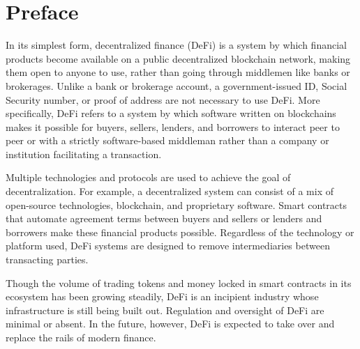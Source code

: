 \chapter*{Preface}
\thispagestyle{fancy}
\label{preface}
\hspace*{5cm}

In its simplest form, decentralized finance (DeFi) is a system by which financial products become available on a public decentralized blockchain network, making them open to anyone to use, rather than going through middlemen like banks or brokerages. Unlike a bank or brokerage account, a government-issued ID, Social Security number, or proof of address are not necessary to use DeFi. More specifically, DeFi refers to a system by which software written on blockchains makes it possible for buyers, sellers, lenders, and borrowers to interact peer to peer or with a strictly software-based middleman rather than a company or institution facilitating a transaction.

Multiple technologies and protocols are used to achieve the goal of decentralization. For example, a decentralized system can consist of a mix of open-source technologies, blockchain, and proprietary software. Smart contracts that automate agreement terms between buyers and sellers or lenders and borrowers make these financial products possible. Regardless of the technology or platform used, DeFi systems are designed to remove intermediaries between transacting parties.

Though the volume of trading tokens and money locked in smart contracts in its ecosystem has been growing steadily, DeFi is an incipient industry whose infrastructure is still being built out. Regulation and oversight of DeFi are minimal or absent. In the future, however, DeFi is expected to take over and replace the rails of modern finance.
\cleardoublepage